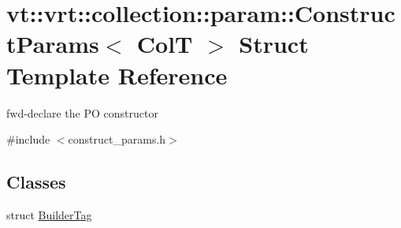 \hypertarget{structvt_1_1vrt_1_1collection_1_1param_1_1_construct_params}{}\section{vt\+:\+:vrt\+:\+:collection\+:\+:param\+:\+:Construct\+Params$<$ ColT $>$ Struct Template Reference}
\label{structvt_1_1vrt_1_1collection_1_1param_1_1_construct_params}


fwd-\/declare the PO constructor  




{\ttfamily \#include $<$construct\+\_\+params.\+h$>$}

\subsection*{Classes}
\begin{DoxyCompactItemize}
\item 
struct \hyperlink{structvt_1_1vrt_1_1collection_1_1param_1_1_construct_params_1_1_builder_tag}{Builder\+Tag}
\end{DoxyCompactItemize}
